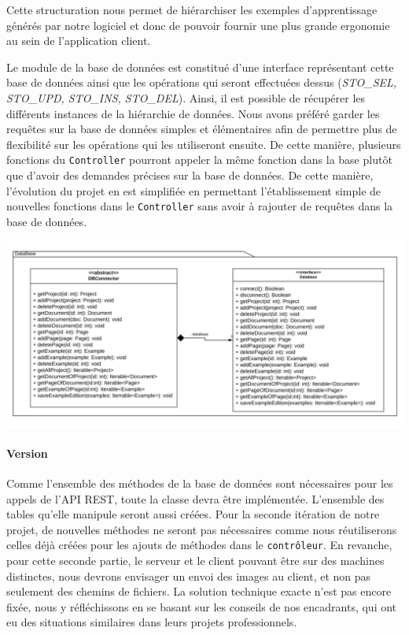 Cette structuration nous permet de hiérarchiser les exemples d'apprentissage générés par notre logiciel et donc de pouvoir fournir une plus grande ergonomie au sein de l'application client.

Le module de la base de données est constitué d'une interface représentant cette base de données ainsi que les opérations qui seront effectuées dessus (\textit{STO\_SEL, STO\_UPD, STO\_INS, STO\_DEL}). Ainsi, il est possible de récupérer les différents instances de la hiérarchie de données. Nous avons préféré garder les requêtes sur la base de données simples et élémentaires afin de permettre plus de flexibilité sur les opérations qui les utiliseront ensuite. De cette manière, plusieurs fonctions du \texttt{Controller} pourront appeler la même fonction dans la base plutôt que d'avoir des demandes précises sur la base de données. De cette manière, l'évolution du projet en est simplifiée en permettant l'établissement simple de nouvelles fonctions dans le \texttt{Controller} sans avoir à rajouter de requêtes dans la base de données.

\newpage
\begin{mdframed}[frametitle={Figure 11 : Architecture de la base de données}, innerbottommargin=10]
\begin{center}
\includegraphics[scale=0.5]{assets/UML_Database.pdf}
\end{center}
\end{mdframed}

\paragraph{Version}
Comme l'ensemble des méthodes de la base de données sont nécessaires pour les appels de l'API REST, toute la classe devra être implémentée. L'ensemble des tables qu'elle manipule seront aussi créées. Pour la seconde itération de notre projet, de nouvelles méthodes ne seront pas nécessaires comme nous réutiliserons celles déjà créées pour les ajouts de méthodes dans le \texttt{contrôleur}. En revanche, pour cette seconde partie, le serveur et le client pouvant être sur des machines distinctes, nous devrons envisager un envoi des images au client, et non pas seulement des chemins de fichiers. La solution technique exacte n'est pas encore fixée, nous y réfléchissons en se basant sur les conseils de nos encadrants, qui ont eu des situations similaires dans leurs projets professionnels.

